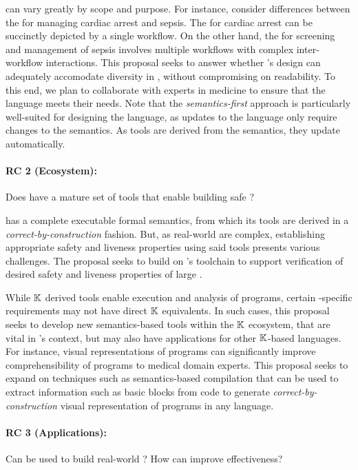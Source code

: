 \BPGs{} can vary greatly by scope and purpose. For instance,
consider differences between the \BPGs{} for managing cardiac
arrest and sepsis. The \BPG{} for cardiac arrest can be
succinctly depicted by a single workflow. On the other hand, the \BPG{} for
screening and management of sepsis involves multiple workflows with complex
inter-workflow interactions.
This proposal seeks to answer whether \MediK{}'s
design can adequately accomodate diversity in \BPGs{}, without
compromising on readability. To this end, we plan to collaborate with
experts in medicine to ensure that the language meets their needs.
Note that the \emph{semantics-first} approach is particularly
well-suited for designing the language, as updates to the language
only require changes to the semantics. As tools are derived from the semantics,
they update automatically.

\paragraph{RC 2 (Ecosystem):} Does \MediK{} have a mature
set of tools that enable building safe \CDSSs{}?

\MediK{} has a complete executable formal semantics, from which
its tools are derived in a \emph{correct-by-construction} fashion.
But, as real-world \BPGs{} are complex, establishing appropriate safety and liveness properties using
said tools presents various challenges. The proposal seeks to build on
\MediK{}'s toolchain to support verification of desired safety and liveness
properties of large \BPGs{}.

While $\mathbb{K}$ derived tools enable execution and analysis of \MediK{} programs,
certain \BPG{}-specific requirements may not have direct $\mathbb{K}{}$ equivalents.
In such cases, this proposal seeks to develop new semantics-based tools within
the $\mathbb{K}{}$ ecosystem, that are vital in \MediK's context, but may also have
applications for other $\mathbb{K}$-based languages.
For instance, visual representations of \MediK{} programs can
significantly improve comprehensibility of \MediK{} programs to medical domain
experts. This proposal seeks to expand on techniques
such as semantics-based compilation that can be used to extract information such
as basic blocks from code to generate \emph{correct-by-construction} visual
representation of programs in any language.

\paragraph{RC 3 (Applications):} Can \MediK{} be used to build real-world
\CDSS{}? How can \MediK{} improve \CDSSs{} effectiveness?

